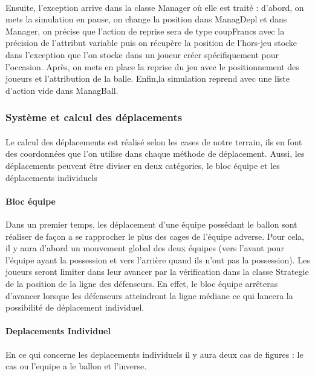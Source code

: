 \paragraph{}    
    Ensuite, l'exception arrive dans la classe Manager où elle est traité : d'abord, on mets la simulation en pause, on change la position dans ManagDepl et dans Manager, on précise que l'action de reprise sera de type coupFrancs avec la précision de l'attribut variable puis on récupère la position de l'hors-jeu stocke dans l'exception que l'on stocke dans un joueur créer spécifiquement pour l'occasion. Après, on mets en place la reprise du jeu avec le positionnement des joueurs et l'attribution de la balle. Enfin,la simulation reprend avec une liste d'action vide dans ManagBall.
    

\subsubsection{Système et calcul des déplacements}

\paragraph{}
    Le calcul des déplacements est réalisé selon les cases de notre terrain, ils en font des coordonnées que l'on utilise dans chaque méthode de déplacement. Aussi, les déplacements peuvent être diviser en deux catégories, le bloc équipe et les déplacements individuels

\paragraph{Bloc équipe}
    Dans un premier temps, les déplacement d'une équipe possédant le ballon sont réaliser de façon a se rapprocher le plus des cages de l'équipe adverse. Pour cela, il y aura d'abord un mouvement global des deux équipes (vers l'avant pour l'équipe ayant la possession et vers l'arrière quand ils n'ont pas la possession). Les joueurs seront limiter dans leur avancer par la vérification dans la classe Strategie de la position de la ligne des défenseurs. En effet, le bloc équipe arrêteras d'avancer lorsque les défenseurs atteindront la ligne médiane ce qui lancera la possibilité de déplacement individuel.
     

\paragraph{Deplacements Individuel}
    En ce qui concerne les deplacements individuels il y aura deux cas de figures : le cas ou l'equipe a le ballon et l'inverse. 

